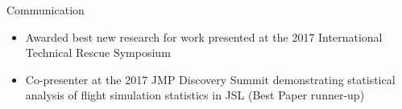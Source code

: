 \documentclass[]{friggeri-cv}
\begin{document}
\begin{entrylist}




    \entry
    {}
    {Communication}
    {}
    {\vspace{-4mm}
    \begin{itemize}
    \item Awarded best new research for work presented at the 2017 International Technical Rescue Symposium
    \item Co-presenter at the 2017 JMP Discovery Summit demonstrating statistical analysis of flight simulation statistics in JSL (Best Paper runner-up)
    \end{itemize}\vspace{1mm}}











\end{entrylist}
\end{document}
